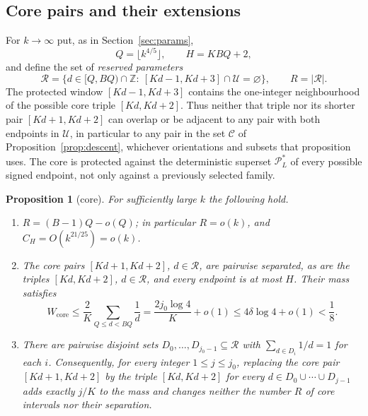 \documentclass[11pt,letterpaper]{article}
\numberwithin{equation}{section}
\theoremstyle{plain}
\newtheorem{proposition}{Proposition}
\theoremstyle{remark}
\newcommand{\Z}{\mathbb Z}
\newcommand{\cP}{\mathcal P}
\newcommand{\cU}{\mathcal U}
\newcommand{\cR}{\mathcal R}
\newcommand{\cC}{\mathcal C}
\newcommand{\core}{\mathrm{core}}
\begin{document}
\subsection{Core pairs and their extensions}\label{sec:coreconstr}

For $k\to\infty$ put, as in Section~\ref{sec:params},
\[
Q=\lfloor k^{4/5}\rfloor,\qquad H=KBQ+2,
\]
and define the set of \emph{reserved parameters}
\begin{equation}\label{eq:reserved}
\cR=\bigl\{d\in[Q,BQ)\cap\Z:\ [Kd-1,Kd+3]\cap\cU=\varnothing\bigr\},\qquad R=|\cR| .
\end{equation}
The protected window $[Kd-1,Kd+3]$ contains the one-integer neighbourhood of the possible core triple $[Kd,Kd+2]$. Thus neither that triple nor its shorter pair $[Kd+1,Kd+2]$ can overlap or be adjacent to any pair with both endpoints in $\cU$, in particular to any pair in the set $\cC$ of Proposition~\ref{prop:descent}, whichever orientations and subsets that proposition uses. The core is protected against the deterministic superset $\cP^*_L$ of every possible signed endpoint, not only against a previously selected family.

\begin{proposition}[core]\label{prop:core}
For sufficiently large $k$ the following hold.
\begin{enumerate}
\item[(i)] $R=(B-1)Q-o(Q)$; in particular $R=o(k)$, and $C_H=O(k^{21/25})=o(k)$.
\item[(ii)] The core pairs $[Kd+1,Kd+2]$, $d\in\cR$, are pairwise separated, as are the triples $[Kd,Kd+2]$, $d\in\cR$, and every endpoint is at most $H$. Their mass satisfies
\begin{equation}\label{eq:Wcore}
W_{\core}\le\frac2K\sum_{Q\le d<BQ}\frac1d=\frac{2j_0\log4}K+o(1)\le4\delta\log4+o(1)<\frac18 .
\end{equation}
\item[(iii)] There are pairwise disjoint sets $D_0,\ldots,D_{j_0-1}\subseteq\cR$ with $\sum_{d\in D_i}1/d=1$ for each $i$. Consequently, for every integer $1\le j\le j_0$, replacing the core pair $[Kd+1,Kd+2]$ by the triple $[Kd,Kd+2]$ for every $d\in D_0\cup\cdots\cup D_{j-1}$ adds exactly $j/K$ to the mass and changes neither the number $R$ of core intervals nor their separation.
\end{enumerate}
\end{proposition}
\end{document}
